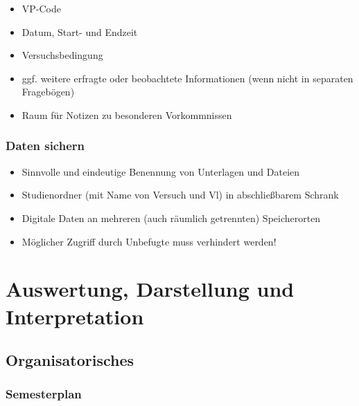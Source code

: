 \documentclass[
]{book}
\begin{document}
\begin{itemize}
\item
  VP-Code
\item
  Datum, Start- und Endzeit
\item
  Versuchsbedingung
\item
  ggf. weitere erfragte oder beobachtete Informationen (wenn nicht in separaten Fragebögen)
\item
  Raum für Notizen zu besonderen Vorkommnissen
\end{itemize}

\hypertarget{daten-sichern}{%
\subsection{Daten sichern}\label{daten-sichern}}

\begin{itemize}
\item
  Sinnvolle und eindeutige Benennung von Unterlagen und Dateien
\item
  Studienordner (mit Name von Versuch und Vl) in abschließbarem Schrank
\item
  Digitale Daten an mehreren (auch räumlich getrennten) Speicherorten
\item
  Möglicher Zugriff durch Unbefugte muss verhindert werden!
\end{itemize}

\hypertarget{auswertung-darstellung-und-interpretation}{%
\chapter{Auswertung, Darstellung und Interpretation}\label{auswertung-darstellung-und-interpretation}}

\hypertarget{organisatorisches-9}{%
\section{Organisatorisches}\label{organisatorisches-9}}

\hypertarget{semesterplan-10}{%
\subsection{Semesterplan}\label{semesterplan-10}}
\end{document}
